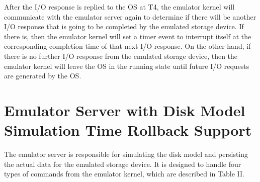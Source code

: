 After the I/O response is replied to the OS at T4, the emulator kernel will communicate with the emulator server again to determine if there will be another I/O response that is going to be completed by the emulated storage device. If there is, then the emulator kernel will set a timer event to interrupt itself at the corresponding completion time of that next I/O response. On the other hand, if there is no further I/O response from the emulated storage device, then the emulator kernel will leave the OS in the running state until future I/O requests are generated by the OS.

\section{Emulator Server with Disk Model Simulation Time Rollback Support}
\label{sec:ch6-6.3}

The emulator server is responsible for simulating the disk model and persisting the actual data for the emulated storage device. It is designed to handle four types of commands from the emulator kernel, which are described in Table II.

